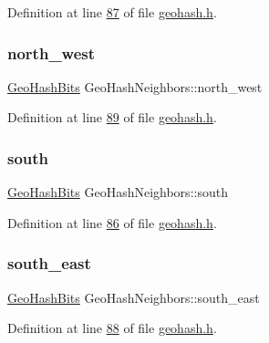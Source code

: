Definition at line \hyperlink{geohash_8h_source_l00087}{87} of file \hyperlink{geohash_8h_source}{geohash.\+h}.

\mbox{\label{structGeoHashNeighbors_ab2fec3a00a28a7e9e9c3641b1fffe339}} 
\subsubsection{\texorpdfstring{north\+\_\+west}{north\_west}}
{\footnotesize\ttfamily \hyperlink{structGeoHashBits}{Geo\+Hash\+Bits} Geo\+Hash\+Neighbors\+::north\+\_\+west}



Definition at line \hyperlink{geohash_8h_source_l00089}{89} of file \hyperlink{geohash_8h_source}{geohash.\+h}.

\mbox{\label{structGeoHashNeighbors_ac7296edba35bf6b2b8e64d7a4ad19f77}} 
\subsubsection{\texorpdfstring{south}{south}}
{\footnotesize\ttfamily \hyperlink{structGeoHashBits}{Geo\+Hash\+Bits} Geo\+Hash\+Neighbors\+::south}



Definition at line \hyperlink{geohash_8h_source_l00086}{86} of file \hyperlink{geohash_8h_source}{geohash.\+h}.

\mbox{\label{structGeoHashNeighbors_a658f33bc982fddf7579d198009cf4124}} 
\subsubsection{\texorpdfstring{south\+\_\+east}{south\_east}}
{\footnotesize\ttfamily \hyperlink{structGeoHashBits}{Geo\+Hash\+Bits} Geo\+Hash\+Neighbors\+::south\+\_\+east}



Definition at line \hyperlink{geohash_8h_source_l00088}{88} of file \hyperlink{geohash_8h_source}{geohash.\+h}.

